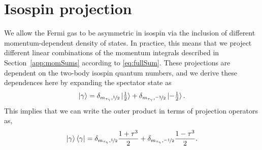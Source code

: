 \section{Isospin projection}
We allow the Fermi gas to be asymmetric in isospin via the inclusion of different momentum-dependent density of states. In practice, this means that we project different linear combinations of the momentum integrals described in Section~\ref{app:momSums} according to \eqref{eq:fullSum}. These projections are dependent on the two-body isospin quantum numbers, and we derive these dependences here by expanding the spectator state as 
\begin{equation}
\ket{\gamma}=\delta_{m_{\tau_\gamma},\nicefrac{1}{2}}\ket{\tfrac{1}{2}}+\delta_{m_{\tau_\gamma},\nicefrac{-1}{2}}\ket{-\tfrac{1}{2}}.
\end{equation}
This implies that we can write the outer product in terms of projection operators as,
\begin{equation}\label{eq:tauProjections}
\ket{\gamma}\bra{\gamma} = \delta_{m_{\tau_\gamma},\nicefrac{1}{2}}\dfrac{1+\tau^3}{2}+\delta_{m_{\tau_\gamma},\nicefrac{-1}{2}}\frac{1-\tau^3}{2}.
\end{equation}

